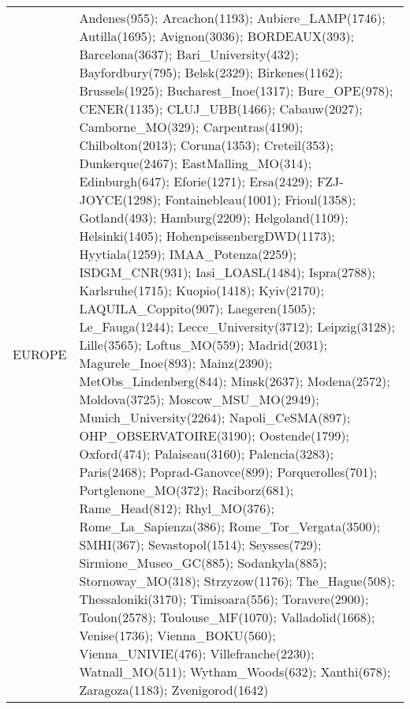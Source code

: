 \documentclass[journal abbreviation, manuscript]{copernicus}
\begin{document}
\clearpage
\begin{table}
 \tiny
 \begin{tabularx}{\textwidth}{lX}
\middlehline
    EUROPE &                                                                                                                                                                                                                                                                                                                                                                                                                                                                                                                                     Andenes(955); Arcachon(1193); Aubiere\_LAMP(1746); Autilla(1695); Avignon(3036); BORDEAUX(393); Barcelona(3637); Bari\_University(432); Bayfordbury(795); Belsk(2329); Birkenes(1162); Brussels(1925); Bucharest\_Inoe(1317); Bure\_OPE(978); CENER(1135); CLUJ\_UBB(1466); Cabauw(2027); Camborne\_MO(329); Carpentras(4190); Chilbolton(2013); Coruna(1353); Creteil(353); Dunkerque(2467); EastMalling\_MO(314); Edinburgh(647); Eforie(1271); Ersa(2429); FZJ-JOYCE(1298); Fontainebleau(1001); Frioul(1358); Gotland(493); Hamburg(2209); Helgoland(1109); Helsinki(1405); HohenpeissenbergDWD(1173); Hyytiala(1259); IMAA\_Potenza(2259); ISDGM\_CNR(931); Iasi\_LOASL(1484); Ispra(2788); Karlsruhe(1715); Kuopio(1418); Kyiv(2170); LAQUILA\_Coppito(907); Laegeren(1505); Le\_Fauga(1244); Lecce\_University(3712); Leipzig(3128); Lille(3565); Loftus\_MO(559); Madrid(2031); Magurele\_Inoe(893); Mainz(2390); MetObs\_Lindenberg(844); Minsk(2637); Modena(2572); Moldova(3725); Moscow\_MSU\_MO(2949); Munich\_University(2264); Napoli\_CeSMA(897); OHP\_OBSERVATOIRE(3190); Oostende(1799); Oxford(474); Palaiseau(3160); Palencia(3283); Paris(2468); Poprad-Ganovce(899); Porquerolles(701); Portglenone\_MO(372); Raciborz(681); Rame\_Head(812); Rhyl\_MO(376); Rome\_La\_Sapienza(386); Rome\_Tor\_Vergata(3500); SMHI(367); Sevastopol(1514); Seysses(729); Sirmione\_Museo\_GC(885); Sodankyla(885); Stornoway\_MO(318); Strzyzow(1176); The\_Hague(508); Thessaloniki(3170); Timisoara(556); Toravere(2900); Toulon(2578); Toulouse\_MF(1070); Valladolid(1668); Venise(1736); Vienna\_BOKU(560); Vienna\_UNIVIE(476); Villefranche(2230); Watnall\_MO(511); Wytham\_Woods(632); Xanthi(678); Zaragoza(1183); Zvenigorod(1642) \\

\end{tabularx}
\end{table}
\end{document}
